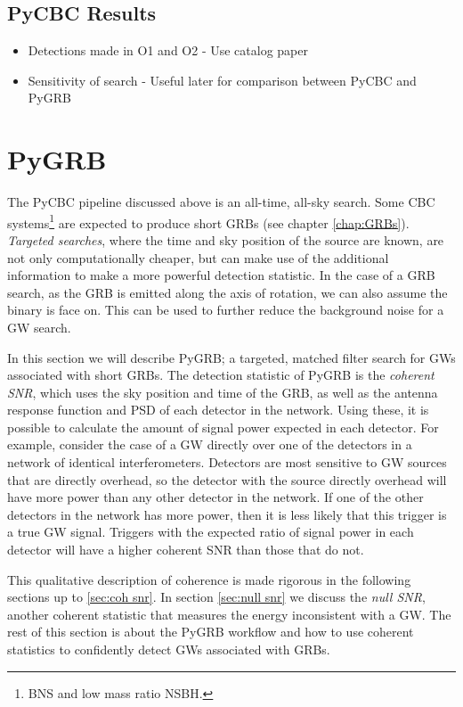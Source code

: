 \documentclass[11pt]{cuthesis}
\begin{document}
\subsection{PyCBC Results}
\begin{itemize}
\item Detections made in O1 and O2 - Use catalog paper
\item Sensitivity of search - Useful later for comparison between PyCBC and PyGRB
\end{itemize}

\section{PyGRB} \label{sec:PyGRB}
The PyCBC pipeline discussed above is an all-time, all-sky search. Some CBC systems\footnote{BNS and low mass ratio NSBH.} are expected to produce short GRBs (see chapter \ref{chap:GRBs}). \textit{Targeted searches}, where the time and sky position of the source are known, are not only computationally cheaper, but can make use of the additional information to make a more powerful detection statistic. In the case of a GRB search, as the GRB is emitted along the axis of rotation, we can also assume the binary is face on. This can be used to further reduce the background noise for a GW search. 

In this section we will describe PyGRB; a targeted, matched filter search for GWs associated with short GRBs. The detection statistic of PyGRB is the \textit{coherent SNR}, which uses the sky position and time of the GRB, as well as the antenna response function and PSD of each detector in the network. Using these, it is possible to calculate the amount of signal power expected in each detector. For example, consider the case of a GW directly over one of the detectors in a network of identical interferometers. Detectors are most sensitive to GW sources that are directly overhead, so the detector with the source directly overhead will have more power than any other detector in the network. If one of the other detectors in the network has more power, then it is less likely that this trigger is a true GW signal. Triggers with the expected ratio of signal power in each detector will have a higher coherent SNR than those that do not. 

This qualitative description of coherence is made rigorous in the following sections up to \ref{sec:coh snr}. In section \ref{sec:null snr} we discuss the \textit{null SNR}, another coherent statistic that measures the energy inconsistent with a GW. The rest of this section is about the PyGRB workflow and how to use coherent statistics to confidently detect GWs associated with GRBs. 
\end{document}
